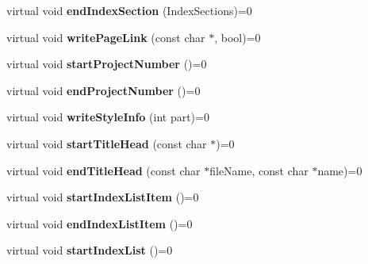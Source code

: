 \begin{DoxyCompactItemize}
\item 
\hypertarget{class_output_generator_a4b6f3553560521c8aa313bfe4f820001}{virtual void {\bfseries end\-Index\-Section} (Index\-Sections)=0}\label{class_output_generator_a4b6f3553560521c8aa313bfe4f820001}

\item 
\hypertarget{class_output_generator_a34c550e9e9cba42dd5fba7bd4ef17e0f}{virtual void {\bfseries write\-Page\-Link} (const char $\ast$, bool)=0}\label{class_output_generator_a34c550e9e9cba42dd5fba7bd4ef17e0f}

\item 
\hypertarget{class_output_generator_a164ca4dcb6254535769f3bc3d153bed3}{virtual void {\bfseries start\-Project\-Number} ()=0}\label{class_output_generator_a164ca4dcb6254535769f3bc3d153bed3}

\item 
\hypertarget{class_output_generator_aeae79d7a64fc0e95f95def0022c234db}{virtual void {\bfseries end\-Project\-Number} ()=0}\label{class_output_generator_aeae79d7a64fc0e95f95def0022c234db}

\item 
\hypertarget{class_output_generator_a8841c4fcb11681355165553ff903c126}{virtual void {\bfseries write\-Style\-Info} (int part)=0}\label{class_output_generator_a8841c4fcb11681355165553ff903c126}

\item 
\hypertarget{class_output_generator_a67496244469ef1db6ee60cd4e1b34985}{virtual void {\bfseries start\-Title\-Head} (const char $\ast$)=0}\label{class_output_generator_a67496244469ef1db6ee60cd4e1b34985}

\item 
\hypertarget{class_output_generator_a30a8c9315646694a749f4beea3f2f85b}{virtual void {\bfseries end\-Title\-Head} (const char $\ast$file\-Name, const char $\ast$name)=0}\label{class_output_generator_a30a8c9315646694a749f4beea3f2f85b}

\item 
\hypertarget{class_output_generator_a8734517c29046db92a0a5ae6017ce3db}{virtual void {\bfseries start\-Index\-List\-Item} ()=0}\label{class_output_generator_a8734517c29046db92a0a5ae6017ce3db}

\item 
\hypertarget{class_output_generator_a594d144516beb23d9eb7c4aac34cf45c}{virtual void {\bfseries end\-Index\-List\-Item} ()=0}\label{class_output_generator_a594d144516beb23d9eb7c4aac34cf45c}

\item 
\hypertarget{class_output_generator_a1db7789483c8ed8ae71371f7605bcf15}{virtual void {\bfseries start\-Index\-List} ()=0}\label{class_output_generator_a1db7789483c8ed8ae71371f7605bcf15}


\end{DoxyCompactItemize}
